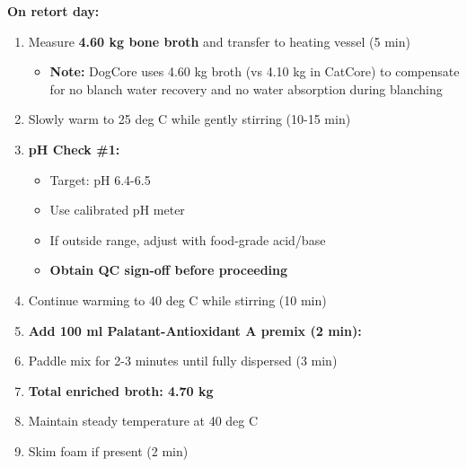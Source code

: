 \textbf{On retort day:}
\begin{enumerate}[resume,leftmargin=1.5em]
\item Measure \textbf{4.60 kg bone broth} and transfer to heating vessel (5 min)
  \begin{itemize}
  \item \textbf{Note:} DogCore uses 4.60 kg broth (vs 4.10 kg in CatCore) to compensate for no blanch water recovery and no water absorption during blanching
  \end{itemize}
\item Slowly warm to 25 deg C while gently stirring (10-15 min)
\item \textbf{pH Check \#1:}
  \begin{itemize}
  \item Target: pH 6.4-6.5
  \item Use calibrated pH meter
  \item If outside range, adjust with food-grade acid/base
  \item \textbf{Obtain QC sign-off before proceeding}
  \end{itemize}
\item Continue warming to 40 deg C while stirring (10 min)
\item \textbf{Add 100 ml Palatant-Antioxidant A premix (2 min):}
  
  
\item Paddle mix for 2-3 minutes until fully dispersed (3 min)
\item \textbf{Total enriched broth: 4.70 kg}
\item Maintain steady temperature at 40 deg C
\item Skim foam if present (2 min)
\end{enumerate}

